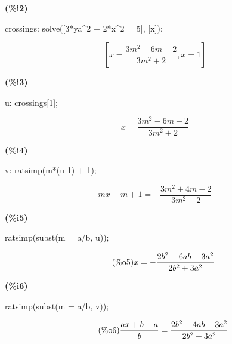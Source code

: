 \documentclass[11pt]{amsart}
\begin{document}
\noindent
\begin{minipage}[t]{8ex}\color{red}\bf
(\%{}i2) 
\end{minipage}
\begin{minipage}[t]{\textwidth}\color{blue}
crossings: solve([3*ya\^{}2 + 2*x\^{}2 = 5], [x]);
\end{minipage}
\[\displaystyle
\tag{crossings}\label{crossings}
[x=\frac{3{{m}^{2}}-6m-2}{3{{m}^{2}}+2},x=1]\mbox{}
\]


\noindent
\begin{minipage}[t]{8ex}\color{red}\bf
(\%{}i3) 
\end{minipage}
\begin{minipage}[t]{\textwidth}\color{blue}
u: crossings[1];
\end{minipage}
\[\displaystyle
\tag{u}\label{u}
x=\frac{3{{m}^{2}}-6m-2}{3{{m}^{2}}+2}\mbox{}
\]


\noindent
\begin{minipage}[t]{8ex}\color{red}\bf
(\%{}i4) 
\end{minipage}
\begin{minipage}[t]{\textwidth}\color{blue}
v: ratsimp(m*(u-1) + 1);
\end{minipage}
\[\displaystyle
\tag{v}\label{v}
mx-m+1=-\frac{3{{m}^{2}}+4m-2}{3{{m}^{2}}+2}\mbox{}
\]


\noindent
\begin{minipage}[t]{8ex}\color{red}\bf
(\%{}i5) 
\end{minipage}
\begin{minipage}[t]{\textwidth}\color{blue}
ratsimp(subst(m = a/b, u));
\end{minipage}
\[\displaystyle
\tag{\%{}o5}\label{o5} 
x=-\frac{2{{b}^{2}}+6ab-3{{a}^{2}}}{2{{b}^{2}}+3{{a}^{2}}}\mbox{}
\]


\noindent
\begin{minipage}[t]{8ex}\color{red}\bf
(\%{}i6) 
\end{minipage}
\begin{minipage}[t]{\textwidth}\color{blue}
ratsimp(subst(m = a/b, v));
\end{minipage}
\[\displaystyle
\tag{\%{}o6}\label{o6} 
\frac{ax+b-a}{b}=\frac{2{{b}^{2}}-4ab-3{{a}^{2}}}{2{{b}^{2}}+3{{a}^{2}}}\mbox{}
\]
\end{document}
